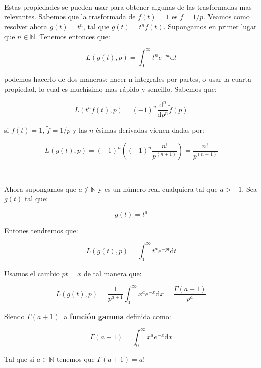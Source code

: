 \documentclass[12pt,a4paper]{book}
\newcommand{\D}{\mathrm{d}}
\newcommand{\into}{\int_{0}^{\infty}}
\newcommand{\tf}{\tilde{f}}
\begin{document}
\begin{flushleft}

\hrulefill \\

Estas propiedades se pueden usar para obtener algunas de las trasformadas mas relevantes. Sabemos que la trasformada de $f(t) = 1$ es $\tf = 1/p$. Veamos como resolver ahora $g(t) = t^n$, tal que $g(t)=t^n f(t)$. Supongamos en primer lugar que $n \in \mathbb{N}$. Tenemos entonces que:

$$ L(g(t),p) = \into t^n e^{-pt} \D t $$

podemos hacerlo de dos maneras: hacer n integrales por partes, o usar la cuarta propiedad, lo cual es muchísimo mas rápido y sencillo. Sabemos que:

$$ L(t^n f(t), p) = (-1)^n \dfrac{\D^n}{\D p^n} \tilde{f} (p) $$

si $f(t)=1$, $\tf = 1/p$ y las $n$-ésimas derivadas vienen dadas por:

$$ L(g(t),p) = (-1)^n \left( (-1)^n \dfrac{n!}{p^{(n+1)}} \right) = \dfrac{n!}{p^{(n+1)}}$$

\hrulefill \\

\hrulefill

Ahora supongamos que $a \notin \mathbb{N}$ y es un número real cualquiera tal que $a > -1$. Sea $g(t)$ tal que:

$$ g(t) = t^a $$

Entones tendremos que:

$$L(g(t),p) = \into t^a e^{-pt} \D t $$

Usamos el cambio $pt = x$ de tal manera que:

$$ L(g(t),p) = \dfrac{1}{p^{a+1}} \into x^a e^{-x} \D x = \dfrac{\Gamma(a+1)}{p^a} $$

Siendo $\Gamma (a+1)$ la \textbf{función gamma} definida como:

\begin{equation}
\Gamma (a+1) = \into x^a e^{-x} \D x
\end{equation}

Tal que si $a \in \mathbb{N}$ tenemos que $\Gamma (a+1) = a!$

\hrulefill 

\end{flushleft}
\end{document}
